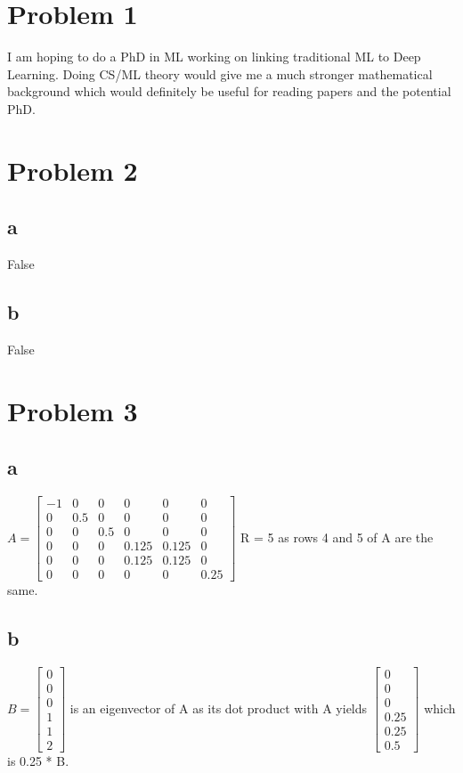 \documentclass[twoside]{homework}
\begin{document}
\maketitle

\section*{Problem 1}
I am hoping to do a PhD in ML working on linking traditional ML to Deep Learning. Doing CS/ML theory would give me a much stronger mathematical background which would definitely be useful for reading papers and the potential PhD.

\section*{Problem 2}
\subsection*{a} False
\subsection*{b} False
\newpage

\section*{Problem 3}
\subsection*{a}
$A = 
\begin{bmatrix}
    -1 & 0 & 0 & 0 & 0 & 0 \\
    0 & 0.5 & 0 & 0 & 0 & 0 \\
    0 & 0 & 0.5 & 0 & 0 & 0 \\
    0 & 0 & 0 & 0.125 & 0.125 & 0 \\
    0 & 0 & 0 & 0.125 & 0.125 & 0 \\
    0 & 0 & 0 & 0 & 0 & 0.25
\end{bmatrix}
$
R = 5 as rows 4 and 5 of A are the same.

\subsection*{b}
$
B =
\begin{bmatrix}
    0 \\
    0 \\
    0 \\
    1 \\
    1 \\
    2
\end{bmatrix}$ 
is an eigenvector of A as its dot product with A yields 
$\begin{bmatrix}
    0 \\
    0 \\
    0 \\
    0.25 \\
    0.25 \\
    0.5
\end{bmatrix}$
which is 0.25 * B.
\end{document}
